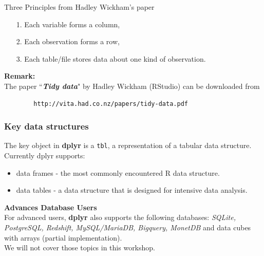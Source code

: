 \documentclass{beamer}
\begin{document}
	\begin{frame}[fragile]
		\begin{framed}
			\noindent Three Principles from Hadley Wickham's paper
			\begin{itemize}
				\item[1.] Each variable forms a column, 
				\item[2.] Each observation forms a row, 
				\item[3.] Each table/file stores data about one kind of observation.
			\end{itemize}
		\end{framed}
		\noindent \textbf{Remark:} \\  The paper ``\textit{\textbf{Tidy data}}" by Hadley Wickham (RStudio) can be downloaded from 
		\begin{verbatim}
		http://vita.had.co.nz/papers/tidy-data.pdf
		\end{verbatim}
	\end{frame}
	\begin{frame}
		\frametitle{Key data structures}
		
		The key object in \textbf{dplyr} is a \texttt{tbl}, a representation of a tabular data structure. Currently dplyr supports:
		
		\begin{itemize}
			\item data frames - the  most commonly encountered R data structure. 
			\item data tables - a data structure that is designed for intensive data analysis.
		\end{itemize}
		
	\end{frame}
	\begin{frame}
		\textbf{Advances Database Users}\\
		\noindent For advanced users, \textbf{dplyr} also supports the following databases: \textit{SQLite, PostgreSQL, Redshift, MySQL/MariaDB, Bigquery, MonetDB} and data cubes with arrays (partial implementation).\\ \bigskip We will not cover those topics in this workshop.
	\end{frame}
\end{document}
